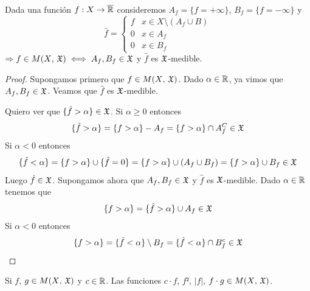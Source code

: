 \begin{lemma}
    Dada una función \(f: X \to \overline{\mathbb{R}}\) consideremos \(A_f = \{ f = +\infty \}\), \(B_f = \{ f = -\infty \}\) y
    \begin{equation*} \hat{f} = \begin{cases}
            f & x \in X \setminus (A_f \cup B) \\
            0 & x \in A_f                      \\
            0 & x \in B_f
        \end{cases}
    \end{equation*}
    \(\Rightarrow f \in M(X\text{, } \mathfrak{X}) \iff A_f, B_f \in \mathfrak{X}\) y \(\hat{f}\) es \(\mathfrak{X}\)-medible.
    \begin{proof}
        Supongamos primero que \(f \in M(X\text{, } \mathfrak{X})\). Dado \(\alpha \in \mathbb{R}\), ya vimos que \(A_f, B_f \in \mathfrak{X}\). Veamos que \(\hat{f}\) es \(\mathfrak{X}\)-medible.

        Quiero ver que \(\{ \hat{f} > \alpha \} \in \mathfrak{X}\). Si \(\alpha \geq 0\) entonces
        \begin{equation*}
            \{ \hat{f} > \alpha \} = \{ f > \alpha \} - A_f = \{ f > \alpha \} \cap A_f^C \in \mathfrak{X}
        \end{equation*}
        Si \(\alpha < 0\) entonces \begin{equation*}
            \{ \hat{f} < \alpha \} = \{ f > \alpha \} \cup \{ \hat{f} = 0 \} = \{ f > \alpha \} \cup (A_f \cup B_f) = \{ f > \alpha\} \cup B_f \in \mathfrak{X}
        \end{equation*}
        Luego \(\hat{f} \in \mathfrak{X}\). Supongamos ahora que \(A_f, B_f \in \mathfrak{X}\) y \(\hat{f}\) es \(\mathfrak{X}\)-medible. Dado \(\alpha \in \mathbb{R}\) tenemos que \begin{equation*}
            \{ f > \alpha \} = \{ \hat{f} > \alpha \} \cup A_f \in \mathfrak{X}
        \end{equation*}
        Si \(\alpha < 0\) entonces \begin{equation*}
            \{ f > \alpha \} = \{ \hat{f} < \alpha \} \setminus B_f = \{ \hat{f} < \alpha \} \cap B_f^c \in \mathfrak{X}
        \end{equation*}
    \end{proof}
\end{lemma}

\begin{corollary}
    Si \(f\), \(g \in M(X \text{, } \mathfrak{X})\) y \(c \in \mathbb{R}\). Las funciones \(c \cdot f\), \(f²\), \(|f|\), \(f \cdot g \in M(X \text{, } \mathfrak{X})\).
\end{corollary}

